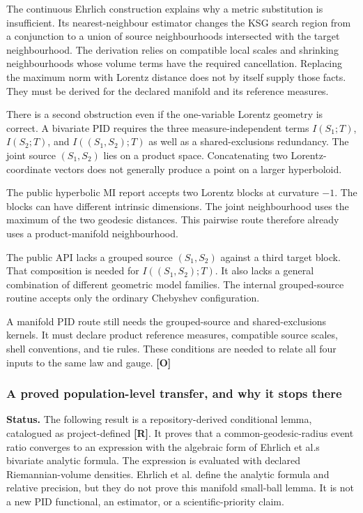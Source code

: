 \documentclass[
  11pt,
  a4paper,
]{article}
\begin{document}
The continuous Ehrlich construction explains why a metric substitution
is insufficient. Its nearest-neighbour estimator changes the KSG search
region from a conjunction to a union of source neighbourhoods
intersected with the target neighbourhood. The derivation relies on
compatible local scales and shrinking neighbourhoods whose volume terms
have the required cancellation. Replacing the maximum norm with Lorentz
distance does not by itself supply those facts. They must be derived for
the declared manifold and its reference measures.

There is a second obstruction even if the one-variable Lorentz geometry
is correct. A bivariate PID requires the three measure-independent terms
\(I(S_1;T)\), \(I(S_2;T)\), and \(I((S_1,S_2);T)\) as well as a
shared-exclusions redundancy. The joint source \((S_1,S_2)\) lies on a
product space. Concatenating two Lorentz-coordinate vectors does not
generally produce a point on a larger hyperboloid.

The public hyperbolic MI report accepts two Lorentz blocks at curvature
\(-1\). The blocks can have different intrinsic dimensions. The joint
neighbourhood uses the maximum of the two geodesic distances. This
pairwise route therefore already uses a product-manifold neighbourhood.

The public API lacks a grouped source \((S_1,S_2)\) against a third
target block. That composition is needed for \(I((S_1,S_2);T)\). It also
lacks a general combination of different geometric model families. The
internal grouped-source routine accepts only the ordinary Chebyshev
configuration.

A manifold PID route still needs the grouped-source and
shared-exclusions kernels. It must declare product reference measures,
compatible source scales, shell conventions, and tie rules. These
conditions are needed to relate all four inputs to the same law and
gauge. \textbf{{[}O{]}}

\subsubsection{A proved population-level transfer, and why it stops
there}\label{a-proved-population-level-transfer-and-why-it-stops-there}

\textbf{Status.} The following result is a repository-derived
conditional lemma, catalogued as project-defined \textbf{{[}R{]}}. It
proves that a common-geodesic-radius event ratio converges to an
expression with the algebraic form of Ehrlich et al.\textquotesingle s
bivariate analytic formula. The expression is evaluated with declared
Riemannian-volume densities. Ehrlich et al. define the analytic formula
and relative precision, but they do not prove this manifold small-ball
lemma. It is not a new PID functional, an estimator, or a
scientific-priority claim.
\end{document}
